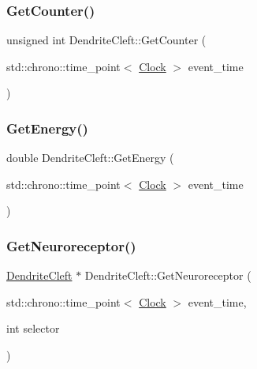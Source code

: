\subsubsection{\texorpdfstring{Get\+Counter()}{GetCounter()}}
{\footnotesize\ttfamily unsigned int Dendrite\+Cleft\+::\+Get\+Counter (\begin{DoxyParamCaption}\item[{std\+::chrono\+::time\+\_\+point$<$ \mbox{\hyperlink{universe_8h_a0ef8d951d1ca5ab3cfaf7ab4c7a6fd80}{Clock}} $>$}]{event\+\_\+time }\end{DoxyParamCaption})\hspace{0.3cm}{\ttfamily [inline]}}

\mbox{\label{classDendriteCleft_ad673df32db3982b3df745a55bf527834}} 
\subsubsection{\texorpdfstring{Get\+Energy()}{GetEnergy()}}
{\footnotesize\ttfamily double Dendrite\+Cleft\+::\+Get\+Energy (\begin{DoxyParamCaption}\item[{std\+::chrono\+::time\+\_\+point$<$ \mbox{\hyperlink{universe_8h_a0ef8d951d1ca5ab3cfaf7ab4c7a6fd80}{Clock}} $>$}]{event\+\_\+time }\end{DoxyParamCaption})\hspace{0.3cm}{\ttfamily [inline]}}

\mbox{\label{classDendriteCleft_a5eb3a8f143f63b852b8f5e245d385519}} 
\subsubsection{\texorpdfstring{Get\+Neuroreceptor()}{GetNeuroreceptor()}}
{\footnotesize\ttfamily \mbox{\hyperlink{classDendriteCleft}{Dendrite\+Cleft}} $\ast$ Dendrite\+Cleft\+::\+Get\+Neuroreceptor (\begin{DoxyParamCaption}\item[{std\+::chrono\+::time\+\_\+point$<$ \mbox{\hyperlink{universe_8h_a0ef8d951d1ca5ab3cfaf7ab4c7a6fd80}{Clock}} $>$}]{event\+\_\+time,  }\item[{int}]{selector }\end{DoxyParamCaption})}

